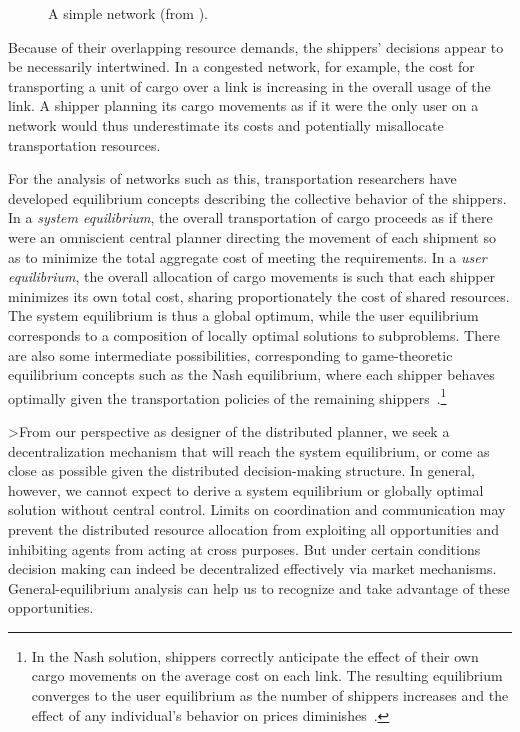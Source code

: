 \begin{figure}[htbp]
\centerline{}
\caption{A simple network (from \protect{}).}
\label{fig:network}
\end{figure}

Because of their overlapping resource demands, the shippers' decisions appear to be
necessarily intertwined.
In a congested network, for example, the cost for transporting a unit of 
cargo over a link is increasing in the overall usage of the link.
A shipper planning its cargo movements as if it were the only user on a network would thus 
underestimate its costs and potentially misallocate transportation resources.

For the analysis of networks such as this, transportation researchers have 
developed equilibrium concepts describing the collective behavior of the 
shippers.
In a {\em system equilibrium}, the overall transportation of cargo proceeds
as if there were an omniscient central planner directing the movement of each 
shipment so as to minimize the total aggregate cost of meeting the 
requirements.
In a {\em user equilibrium}, the overall allocation of cargo movements is 
such that each shipper minimizes its own total cost, sharing proportionately
the cost of shared resources.
The system equilibrium is thus a global optimum, while the user 
equilibrium corresponds to a composition of locally optimal solutions to
subproblems.
There are also some intermediate possibilities, corresponding to 
game-theoretic equilibrium concepts such as the Nash equilibrium, 
where each shipper behaves optimally given the transportation policies of 
the remaining shippers~\cite{Harker86}.\footnote{In the Nash solution, 
shippers correctly anticipate the effect of their own cargo movements on the
average cost on each link.  The resulting equilibrium
converges to the user equilibrium as the number of shippers increases and 
the effect of any individual's behavior on prices 
diminishes~\cite{Haurie85}.}

>From our perspective as designer of the distributed planner, we seek
a decentralization mechanism that will reach the system 
equilibrium, or come as close as possible given the distributed 
decision-making structure.
In general, however, we cannot expect to derive a system equilibrium or globally
optimal solution without central control.
Limits on coordination and communication
may prevent the distributed resource allocation from exploiting all
opportunities and inhibiting agents from acting at cross purposes.
But under certain conditions decision making can indeed be
decentralized effectively via market mechanisms.
General-equilibrium analysis can help us to recognize 
and take advantage of these opportunities.

